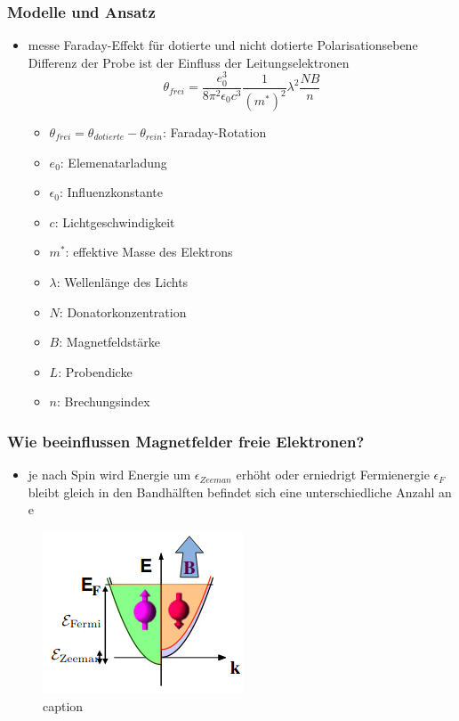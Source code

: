 \subsubsection*{Modelle und Ansatz}
\begin{itemize}
    \item messe Faraday-Effekt für dotierte und nicht dotierte Polarisationsebene
        \to Differenz der Probe ist der Einfluss der Leitungselektronen
        \begin{equation*}
            \theta_{frei}=\frac{e_0^3}{8\pi^2\epsilon_0c^3}\frac{1}{(m^*)^2}\lambda^2\frac{NB}{n}
        \end{equation*}
        \begin{itemize}
            \item $\theta_{frei}=\theta_{dotierte}-\theta_{rein}$: Faraday-Rotation
            \item $e_0$: Elemenatarladung
            \item $\epsilon_0$: Influenzkonstante
            \item $c$: Lichtgeschwindigkeit
            \item $m^*$: effektive Masse des Elektrons 
            \item $\lambda$: Wellenlänge des Lichts 
            \item $N$: Donatorkonzentration
            \item $B$: Magnetfeldstärke
            \item $L$: Probendicke
            \item $n$: Brechungsindex
        \end{itemize}
\end{itemize}

\subsubsection*{Wie beeinflussen Magnetfelder freie Elektronen?}
\begin{itemize}
    \item je nach Spin wird Energie um $\epsilon_{Zeeman}$ erhöht oder erniedrigt
        \to Fermienergie $\epsilon_F$ bleibt gleich
        \iff in den Bandhälften befindet sich eine unterschiedliche Anzahl an e 
\end{itemize}
\begin{figure}[H]
    \centering
    \includegraphics[scale=0.8]{pictures/magnetfeld_freieElektronen.png}
    \\caption{\cite{Magnetismus}}
\end{figure}

